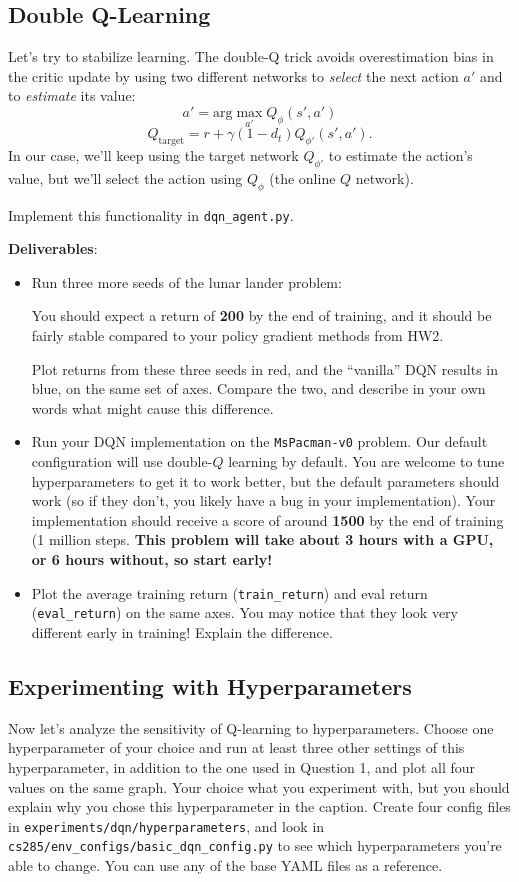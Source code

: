 \documentclass{article}
\begin{document}
\subsection{Double Q-Learning}
Let's try to stabilize learning. The double-Q trick avoids overestimation bias in the critic update by using two different networks to \textit{select} the next action $a'$ and to \textit{estimate} its value:
\[a' = \textrm{arg}\max_{a'} Q_{\phi}(s', a')\]
\[Q_{\textrm{target}} = r + \gamma(1-d_t) Q_{\phi'}(s', a').\]
In our case, we'll keep using the target network $Q_{\phi'}$ to estimate the action's value, but we'll select the action using $Q_{\phi}$ (the online $Q$ network).

Implement this functionality in \verb|dqn_agent.py|.

\textbf{Deliverables}:
\begin{itemize}
    \item Run three more seeds of the lunar lander problem:

    You should expect a return of \textbf{200} by the end of training, and it should be fairly stable compared to your policy gradient methods from HW2.
    
    Plot returns from these three seeds in red, and the ``vanilla'' DQN results in blue, on the same set of axes. Compare the two, and describe in your own words what might cause this difference.

    \item Run your DQN implementation on the \verb|MsPacman-v0| problem. Our default configuration will use double-$Q$ learning by default. You are welcome to tune hyperparameters to get it to work better, but the default parameters should work (so if they don't, you likely have a bug in your implementation). Your implementation should receive a score of around \textbf{1500} by the end of training (1 million steps. \textbf{This problem will take about 3 hours with a GPU, or {\color{red} 6 hours} without, so start early!}

    \item Plot the average training return (\verb|train_return|) and eval return (\verb|eval_return|) on the same axes. You may notice that they look very different early in training! Explain the difference.
\end{itemize}

\subsection{Experimenting with Hyperparameters} Now let's analyze the sensitivity of Q-learning to hyperparameters. Choose one hyperparameter of your choice and run at least three other settings of this hyperparameter, in addition to the one used in Question 1, and plot all four values on the same graph. Your choice what you experiment with, but you should explain why you chose this hyperparameter in the caption. Create four config files in \verb|experiments/dqn/hyperparameters|, and look in \verb|cs285/env_configs/basic_dqn_config.py| to see which hyperparameters you're able to change. You can use any of the base YAML files as a reference.
\end{document}
